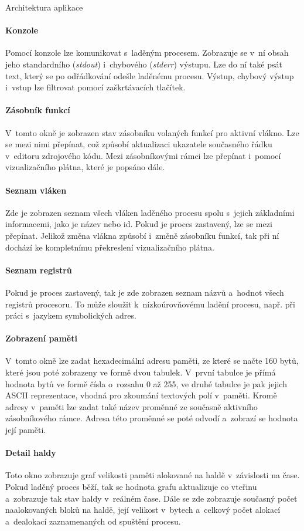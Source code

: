 \documentclass[czech,bachelor,male,python,dept460,hidelinks]{diploma}						%
\begin{document}
\begin{section}{Architektura aplikace}
	\paragraph*{Konzole} Pomocí konzole lze komunikovat s~laděným procesem. Zobrazuje se v~ní obsah jeho standardního (\textit{stdout}) i~chybového (\textit{stderr})
		výstupu. Lze do ní také psát text, který se po odřádkování odešle laděnému procesu. Výstup, chybový výstup i~vstup lze filtrovat pomocí
		zaškrtávacích tlačítek.
	\paragraph*{Zásobník funkcí} V~tomto okně je zobrazen stav zásobníku volaných funkcí pro aktivní vlákno. Lze se mezi nimi přepínat, což způsobí aktualizaci
		ukazatele současného řádku v~editoru zdrojového kódu. Mezi zásobníkovými rámci lze přepínat i~pomocí vizualizačního plátna, které je popsáno dále.
	\paragraph*{Seznam vláken} Zde je zobrazen seznam všech vláken laděného procesu spolu s~jejich základními informacemi, jako je název nebo id. Pokud je proces
		zastavený, lze se mezi přepínat. Jelikož změna vlákna způsobí i~změně zásobníku funkcí, tak při ní dochází ke kompletnímu překreslení vizualizačního
		plátna.
	\paragraph*{Seznam registrů}
		Pokud je proces zastavený, tak je zde zobrazen seznam názvů a~hodnot všech registrů procesoru. To může sloužit k~nízkoúrovňovému ladění procesu, např.
		při práci s~jazykem symbolických adres.
	\paragraph*{Zobrazení paměti} V~tomto okně lze zadat hexadecimální adresu paměti, ze které se načte 160 bytů, které jsou poté zobrazeny ve formě dvou tabulek.
		V~první tabulce je přímá hodnota bytů ve formě čísla o~rozsahu 0 až 255, ve druhé tabulce je pak jejich ASCII reprezentace, vhodná pro zkoumání textových
		polí v~paměti. Kromě adresy v~paměti lze zadat také název proměnné ze současně aktivního zásobníkového rámce. Adresa této proměnné se poté odvodí
		a~zobrazí se hodnota její paměti.
	\paragraph*{Detail haldy}
		Toto okno zobrazuje graf velikosti paměti alokované na haldě v~závislosti na čase. Pokud laděný proces běží, tak se hodnota grafu aktualizuje co vteřinu
		a~zobrazuje tak stav haldy v~reálném čase. Dále se zde zobrazuje současný počet naalokovaných bloků na haldě, její velikost v~bytech a~celkový počet
		alokací a~dealokací zaznamenaných od spuštění procesu.

\end{section}
\end{document}
